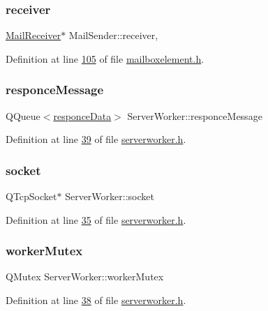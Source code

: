 \subsubsection{\texorpdfstring{receiver}{receiver}}
{\footnotesize\ttfamily \hyperlink{a00197}{Mail\+Receiver}$\ast$ Mail\+Sender\+::receiver\hspace{0.3cm}{\ttfamily [protected]}, {\ttfamily [inherited]}}



Definition at line \hyperlink{a00002_source_l00105}{105} of file \hyperlink{a00002_source}{mailboxelement.\+h}.

\mbox{\label{a00185_ac3d49b227a605c95f42569531f8dbe89}} 
\subsubsection{\texorpdfstring{responce\+Message}{responceMessage}}
{\footnotesize\ttfamily Q\+Queue$<$\hyperlink{a00189}{responce\+Data}$>$ Server\+Worker\+::responce\+Message\hspace{0.3cm}{\ttfamily [protected]}}



Definition at line \hyperlink{a00110_source_l00039}{39} of file \hyperlink{a00110_source}{serverworker.\+h}.

\mbox{\label{a00185_a8f7ef6413cb2697dff4a71835fa5b93d}} 
\subsubsection{\texorpdfstring{socket}{socket}}
{\footnotesize\ttfamily Q\+Tcp\+Socket$\ast$ Server\+Worker\+::socket\hspace{0.3cm}{\ttfamily [protected]}}



Definition at line \hyperlink{a00110_source_l00035}{35} of file \hyperlink{a00110_source}{serverworker.\+h}.

\mbox{\label{a00185_a7284c375ebf78a1dc24fbd801755e783}} 
\subsubsection{\texorpdfstring{worker\+Mutex}{workerMutex}}
{\footnotesize\ttfamily Q\+Mutex Server\+Worker\+::worker\+Mutex\hspace{0.3cm}{\ttfamily [protected]}}



Definition at line \hyperlink{a00110_source_l00038}{38} of file \hyperlink{a00110_source}{serverworker.\+h}.

